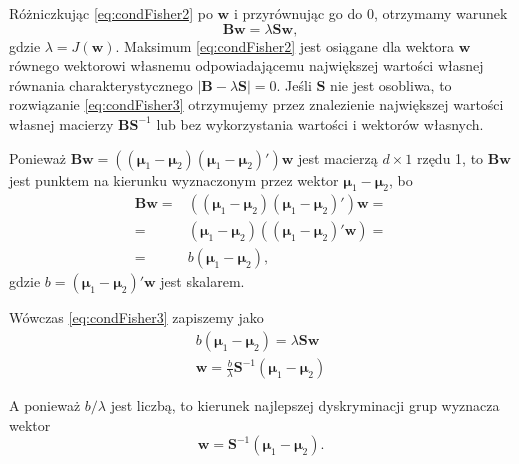 \documentclass[
]{book}
\theoremstyle{plain}
\theoremstyle{definition}
\theoremstyle{definition}
\theoremstyle{definition}
\theoremstyle{definition}
\theoremstyle{definition}
\theoremstyle{remark}
\begin{document}
Różniczkując \eqref{eq:condFisher2} po \(\boldsymbol{w}\) i przyrównując go do 0, otrzymamy warunek
\begin{equation}
    \boldsymbol{B} \boldsymbol{w} = \lambda \boldsymbol{S} \boldsymbol{w},
    \label{eq:condFisher3}
\end{equation}
gdzie \(\lambda=J(\boldsymbol{w})\). Maksimum \eqref{eq:condFisher2} jest osiągane dla wektora \(\boldsymbol{w}\) równego wektorowi własnemu odpowiadającemu największej wartości własnej równania charakterystycznego \(|\boldsymbol{B}-\lambda\boldsymbol{S}|=0\). Jeśli \(\boldsymbol{S}\) nie jest osobliwa, to rozwiązanie \eqref{eq:condFisher3} otrzymujemy przez znalezienie największej wartości własnej macierzy \(\boldsymbol{B}\boldsymbol{S}^{-1}\) lub bez wykorzystania wartości i wektorów własnych.

Ponieważ \(\boldsymbol{B}\boldsymbol w=\left((\boldsymbol{\mu}_1-\boldsymbol{\mu}_2)(\boldsymbol{\mu}_1-\boldsymbol{\mu}_2)'\right)\boldsymbol{w}\) jest macierzą \(d \times 1\) rzędu 1, to \(\boldsymbol{B}\boldsymbol{w}\) jest punktem na kierunku wyznaczonym przez wektor \(\boldsymbol{\mu}_1-\boldsymbol{\mu}_2\), bo
\begin{align}
    \boldsymbol{B}\boldsymbol{w}=& \left((\boldsymbol{\mu}_1-\boldsymbol{\mu}_2)(\boldsymbol{\mu}_1-\boldsymbol{\mu}_2)'\right)\boldsymbol{w}=\\
    =&(\boldsymbol{\mu}_1-\boldsymbol{\mu}_2)((\boldsymbol{\mu}_1-\boldsymbol{\mu}_2)'\boldsymbol{w})=\\
    =& b(\boldsymbol{\mu}_1-\boldsymbol{\mu}_2),
\end{align}
gdzie \(b = (\boldsymbol{\mu}_1-\boldsymbol{\mu}_2)'\boldsymbol{w}\) jest skalarem.

Wówczas \eqref{eq:condFisher3} zapiszemy jako
\begin{gather}
    b(\boldsymbol{\mu}_1-\boldsymbol{\mu}_2) = \lambda\boldsymbol{S}\boldsymbol{w}\\
    \boldsymbol{w}= \frac{b}{\lambda}\boldsymbol{S}^{-1}(\boldsymbol{\mu}_1-\boldsymbol{\mu}_2)
\end{gather}

A ponieważ \(b/\lambda\) jest liczbą, to kierunek najlepszej dyskryminacji grup wyznacza wektor
\begin{equation}
    \boldsymbol{w}=\boldsymbol{S}^{-1}(\boldsymbol{\mu}_1-\boldsymbol{\mu}_2).
\end{equation}
\end{document}

